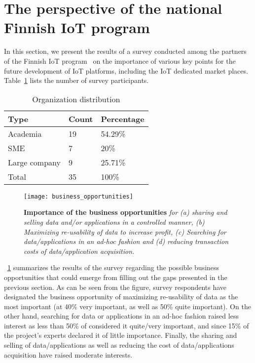 \documentclass[preprint,10pt,5p]{elsarticle}
\begin{document}
\section{The perspective of the national Finnish IoT program}
\label{sec:survey}

In this section, we present the results of a survey conducted
among the partners of the Finnish IoT program~\cite{Tarkoma2013} 
on the importance of various key points for
the future development of IoT platforms, including the IoT dedicated
market places. Table~\ref{tab:organisations} lists the number of
survey participants.

\begin{table}[h]
  \centering
  \caption{Organization distribution}
  \label{tab:organisations}
  \begin{tabular}{|l|l|l|}
    \hline
    Type & Count & Percentage\\\hline
    Academia & 19 & 54.29\%\\
    SME & 7 & 20\%\\
    Large company & 9 & 25.71\%\\\hline
    Total & 35 & 100\%\\\hline
  \end{tabular}
\end{table}

\begin{figure}[t]
  \centering
  \texttt{[image: business\_opportunities]}
  \caption{\textbf{Importance of the business opportunities} \textsl{for (a) sharing and
    selling data and/or applications in a controlled manner, (b)
    Maximizing re-usability of data to increase profit, (c) Searching
    for data/applications in an ad-hoc fashion and (d) reducing
    transaction costs of data/application acquisition.}}
  \label{fig:survey_business_opp}
\end{figure}

\figurename{~\ref{fig:survey_business_opp}} summarizes the results of
the survey regarding the possible business opportunities that could
emerge from filling out the gaps presented in the previous section.
As can be seen from the figure, survey respondents have designated the business opportunity of
maximizing re-usability of data as the most important (at 40\% very
important, as well as 50\% quite important). 
On the other hand, searching for data or applications in an ad-hoc
fashion raised less interest as less than 50\% of considered it quite/very important, 
and since 15\% of the project's experts declared
it of little importance.
Finally, the sharing and selling of data/applications as well as
reducing the cost of data/applications acquisition have raised
moderate interests. 
\end{document}
